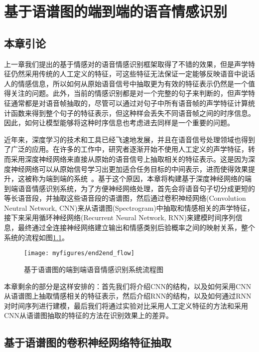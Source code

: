 \chapter{基于语谱图的端到端的语音情感识别}
\label{cha:end2end}

\section{本章引论}
\label{sec:end2end_intro}

上一章我们提出的基于情感对的语音情感识别框架取得了不错的效果，但是声学特征仍然采用传统的人工定义的特征，可这些特征无法保证一定能够反映语音中说话人的情感信息，所以如何从原始语音信号中抽取更为有效的特征表示仍然是一个值得关注的问题。此外，当前的情感识别都是对一个完整的句子来判断的，但声学特征通常都是对语音帧抽取的，尽管可以通过对句子中所有语音帧的声学特征计算统计函数来得到整个句子的特征表示，但这种样会丢失不同语音帧之间的时序信息。因此，如何让模型能够将这种时序信息也考虑进去同样是一个重要的问题。

近年来，深度学习的技术和工具已经飞速地发展，并且在语音信号处理领域也得到了广泛的应用。在许多的工作中，研究者逐渐开始不使用人工定义的声学特征，转而采用深度神经网络来直接从原始的语音信号上抽取相关的特征表示。这是因为深度神经网络可以从原始信号学习出更加适合任务目标的中间表示，进而使得效果提升，这被称为端到端的系统~\cite{Trigeorgis2016Adieu, Satt2017Efficient}。基于这个原因，本章将构建基于深度神经网络的端到端语音情感识别系统，为了方便神经网络处理，首先会将语音句子切分成更短的等长语音段，并抽取这些语音段的语谱图，然后通过卷积神经网络(Convolution Neutral Network, CNN)来从语谱图(Spectrogram)中抽取和情感相关的声学特征，接下来采用循环神经网络(Recurrent Neural Network, RNN)来建模时间序列信息，最终通过全连接神经网络建立输出和情感类别后验概率之间的映射关系，整个系统的流程如图\ref{fig:end2end_flow}。

\begin{figure}[htb] %
    \centering
    \texttt{[image: myfigures/end2end\_flow]}
    \caption{基于语谱图的端到端语音情感识别系统流程图}
    \label{fig:end2end_flow}
\end{figure}

本章剩余的部分是这样安排的：首先我们将介绍CNN的结构，以及如何采用CNN从语谱图上抽取情感相关的特征表示，然后介绍RNN的结构，以及如何通过RNN对时间序列进行建模，最后我们将通过实验对比采用人工定义特征的方法和采用CNN从语谱图抽取的特征的方法在识别效果上的差异。

\section{基于语谱图的卷积神经网络特征抽取}
\label{sec:cnn_spectrogram_feature}

